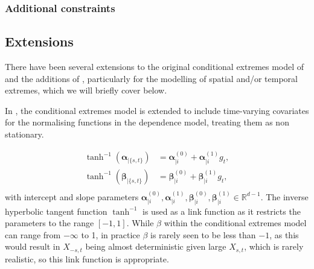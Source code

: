 \documentclass{article}
\numberwithin{equation}{section}
\begin{document}
\subsubsection{Additional constraints}

\subsection{Extensions}

There have been several extensions to the original conditional extremes model of \cite{Heffernan2004} and the additions of \cite{Keef2013}, particularly for the modelling of spatial and/or temporal extremes, which we will briefly cover below. 

In \cite{Winter2016}, the conditional extremes model is extended to include time-varying covariates for the normalising functions in the dependence model, treating them as non stationary. 

\begin{align} \label{eq:ce_winter}
  \tanh^{-1}(\bm{\alpha}_{\mid \{s, t\}}) &= \bm{\alpha}^{(0)}_{\mid i} + \bm{\alpha}^{(1)}_{\mid i}g_t, \\
  \tanh^{-1}(\bm{\beta}_{\mid \{s, t\}}) &= \bm{\beta}^{(0)}_{\mid i} + \bm{\beta}^{(1)}_{\mid i}g_t, \\
\end{align}
with intercept and slope parameters $\bm{\alpha}^{(0)}_{\mid i}, \bm{\alpha}^{(1)}_{\mid i}, \bm{\beta}^{(0)}_{\mid i}, \bm{\beta}^{(1)}_{\mid i} \in \mathbb{R}^{d-1}$. 
The inverse hyperbolic tangent function $\tanh^{-1}$ is used as a link function as it restricts the parameters to the range $[-1, 1]$. 
While $\beta$ within the conditional extremes model can range from $-\infty$ to 1, in practice $\beta$ is rarely seen to be less than $-1$, as this would result in $X_{-s, t}$ being almost deterministic given large $X_{s, t}$, which is rarely realistic, so this link function is appropriate. 
\end{document}
